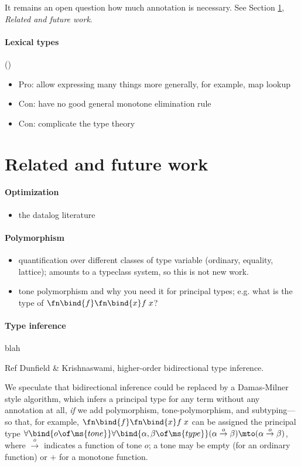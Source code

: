 \documentclass[preprint]{sigplanconf}
\begin{document}
It remains an open question how much annotation is necessary. See
Section \ref{sec:futurework}, \emph{Related and future work}.

\paragraph{Lexical types} ()
\begin{itemize}
\item Pro: allow expressing many things more generally, for example, map lookup
\item Con: have no good general monotone elimination rule
\item Con: complicate the type theory
\end{itemize}

\section{Related and future work}
\label{sec:futurework}

\paragraph{Optimization}
\begin{itemize}
\item \TODO the datalog literature
\end{itemize}

\paragraph{Polymorphism}
\begin{itemize}
\item \TODO quantification over different classes of type variable (ordinary,
  equality, lattice); amounts to a typeclass system, so this is not new work.
\item \TODO tone polymorphism and why you need it for principal types; e.g.
  what is the type of $\fn\bind{f}\fn\bind{x} f\;x$?
\end{itemize}

\paragraph{Type inference} blah

\TODO Ref Dunfield \& Krishnaswami, higher-order bidirectional type inference.

 We speculate that bidirectional inference could be replaced by a
Damas-Milner  style algorithm, which infers a principal type for any
term without any annotation at all, \emph{if} we add polymorphism,
tone-polymorphism, and subtyping---so that, for example, $\fn\bind{f}\fn\bind{x}
f\;x$ can be assigned the principal type
$\forall\bind{o\of\ms{tone}}\forall\bind{\alpha,\beta \of \ms{type}} (\alpha
\overset{o}\to \beta) \mto (\alpha \overset{o}\to \beta)$, where
$\overset{o}\to$ indicates a function of tone $o$; a tone may be empty (for an
ordinary function) or ${+}$ for a monotone function.
\end{document}
